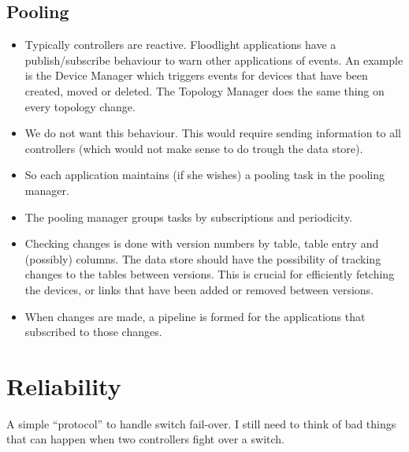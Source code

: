 \documentclass[12pt,openright,twoside]{report}
\begin{document}
\subsection{Pooling}
\begin{itemize}
\item Typically controllers are reactive. Floodlight applications have a publish/subscribe behaviour to warn other applications of events. An example is the Device Manager which triggers events for devices that have been created, moved or deleted. The Topology Manager does the same thing on every topology change. 
\item We do not want this behaviour. This would require sending information to all controllers (which would not make sense to do trough the data store). 
\item So each application maintains (if she wishes) a pooling task in the pooling manager. 
\item The pooling manager groups tasks by subscriptions and periodicity. 
\item Checking changes is done with version numbers by table, table entry and (possibly) columns. The data store should have the possibility of tracking changes to the tables between versions. This is crucial for efficiently fetching the devices, or links that have been added or removed between versions. 
\item When changes are made, a pipeline is formed for the applications that subscribed to those changes. 
\end{itemize}

\section{Reliability}
A simple ``protocol'' to handle switch fail-over. I still need to think of bad things that can happen when two controllers fight over a switch.
\end{document}
